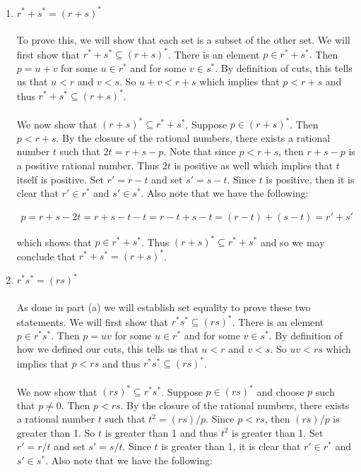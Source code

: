 \documentclass[12pt]{article}
\begin{document}
\begin{enumerate}
\item $r^{*} + s^{*} = (r+s)^{*}$ \\ \\
To prove this, we will show that each set is a subset of the other set. We will first show that $r^{*} + s^{*} \subseteq (r+s)^{*}$. There is an element $p \in r^{*} + s^{*}.$ Then $p=u+v$ for some $u \in r^{*}$ and for some $v \in s^{*}$. By definition of  cuts, this tells us that $u<r$ and $v<s$. So $u+v<r+s$ which implies that $p<r+s$ and thus $r^{*} + s^{*} \subseteq (r+s)^{*}$. \\ \\

We now show that $(r+s)^{*} \subseteq r^{*} + s^{*}$. Suppose $p \in (r+s)^{*}$. Then $p<r+s$. By the closure of the rational numbers, there exists a rational number $t$ such that $2t=r+s-p$. Note that since $p<r+s$, then $r+s-p$ is a positive rational number. Thus $2t$ is positive as well which implies that $t$ itself is positive. Set $r' = r-t$ and set $s'=s-t$. Since $t$ is positive, then it is clear that $r' \in r^{*}$ and $s' \in s^{*}$. Also note that we have the following: 

\begin{align*}
p=r+s-2t=r+s-t-t=r-t+s-t=(r-t)+(s-t)=r'+s'
\end{align*}  

which shows that $p \in r^{*} + s^{*}$. Thus $(r+s)^{*} \subseteq r^{*} + s^{*}$ and so we may conclude that $r^{*} + s^{*} = (r+s)^{*}$. \\

\item $r^{*}s^{*}= (rs)^{*}$ \\ \\

As done in part (a) we will establish set equality to prove these two statements. We will first show that $r^{*}s^{*} \subseteq (rs)^{*}$. There is an element $p \in r^{*}s^{*}$. Then $p=uv$ for some $u \in r^{*}$ and for some $v \in s^{*}$. By definition of how we defined our cuts, this tells us that $u<r$ and $v<s$. So $uv<rs$ which implies that $p<rs$ and thus $r^{*}s^{*} \subseteq (rs)^{*}$. \\ \\

We now show that $(rs)^{*} \subseteq r^{*}s^{*}$. Suppose $p \in (rs)^{*}$ and choose $p$ such that $p \neq 0$. Then $p<rs$. By the closure of the rational numbers, there exists a rational number $t$ such that $t^{2}=(rs)/p$. Since $p<rs$, then $(rs)/p$ is greater than 1. So $t$ is greater than 1 and thus $t^{2}$ is greater than 1. Set $r' = r/t$ and set $s'=s/t$. Since $t$ is greater than 1, it is clear that $r' \in r^{*}$ and $s' \in s^{*}$. Also note that we have the following: 


\end{enumerate}
\end{document}

